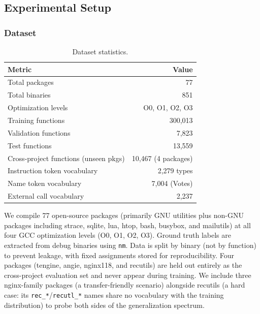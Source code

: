\documentclass[sigconf,nonacm]{acmart}
\begin{document}
\subsection{Experimental Setup}

\subsubsection{Dataset}

\begin{table}[t]
    \centering
    \caption{Dataset statistics.}
    \label{tab:dataset}
    \footnotesize
    \begin{tabular}{lr}
        \toprule
        \textbf{Metric} & \textbf{Value} \\
        \midrule
        Total packages & 77 \\
        Total binaries & 851 \\
        Optimization levels & O0, O1, O2, O3 \\
        Training functions & 300{,}013 \\
        Validation functions & 7{,}823 \\
        Test functions & 13{,}559 \\
        Cross-project functions (unseen pkgs) & 10{,}467 (4 packages) \\
        Instruction token vocabulary & 2{,}279 types \\
        Name token vocabulary & 7{,}004 (Votes) \\
        External call vocabulary & 2{,}237 \\
        \bottomrule
    \end{tabular}
\end{table}

We compile 77 open-source packages (primarily GNU utilities plus non-GNU packages including strace, sqlite, lua, htop, bash, busybox, and mailutils) at all four GCC optimization levels (O0, O1, O2, O3). Ground truth labels are extracted from debug binaries using \texttt{nm}. Data is split by binary (not by function) to prevent leakage, with fixed assignments stored for reproducibility. Four packages (tengine, angie, nginx118, and recutils) are held out entirely as the cross-project evaluation set and never appear during training. We include three nginx-family packages (a transfer-friendly scenario) alongside recutils (a hard case: its \texttt{rec\_*}/\texttt{recutl\_*} names share no vocabulary with the training distribution) to probe both sides of the generalization spectrum.
\end{document}
